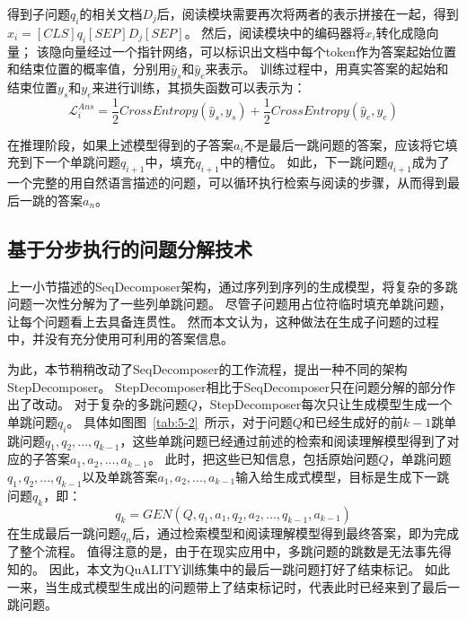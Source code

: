 得到子问题$q_i$的相关文档$D_j$后，阅读模块需要再次将两者的表示拼接在一起，得到$x_i=[CLS]q_i[SEP]D_j[SEP]$。
然后，阅读模块中的编码器将$x_i$转化成隐向量；
该隐向量经过一个指针网络，可以标识出文档中每个token作为答案起始位置和结束位置的概率值，分别用$\hat y_s$和$\hat y_e$来表示。
训练过程中，用真实答案的起始和结束位置$y_s$和$y_e$来进行训练，其损失函数可以表示为：
\begin{equation}
    \mathcal L^{Ans}_{i} = \frac{1}{2} CrossEntropy(\hat y_s,y_s) + \frac{1}{2} CrossEntropy(\hat y_e,y_e)
\end{equation}

在推理阶段，如果上述模型得到的子答案$a_i$不是最后一跳问题的答案，应该将它填充到下一个单跳问题$q_{i+1}$中，填充$q_{i+1}$中的槽位。
如此，下一跳问题$q_{i+1}$成为了一个完整的用自然语言描述的问题，可以循环执行检索与阅读的步骤，从而得到最后一跳的答案$a_n$。

\subsection{基于分步执行的问题分解技术}
上一小节描述的SeqDecomposer架构，通过序列到序列的生成模型，将复杂的多跳问题一次性分解为了一些列单跳问题。
尽管子问题用占位符临时填充单跳问题，让每个问题看上去具备连贯性。
然而本文认为，这种做法在生成子问题的过程中，并没有充分使用可利用的答案信息。

为此，本节稍稍改动了SeqDecomposer的工作流程，提出一种不同的架构StepDecomposer。
StepDecomposer相比于SeqDecomposer只在问题分解的部分作出了改动。
对于复杂的多跳问题$Q$，StepDecomposer每次只让生成模型生成一个单跳问题$q_i$。
具体如图图~\ref{tab:5-2}~所示，对于问题$Q$和已经生成好的前$k-1$跳单跳问题$q_1, q_2, ..., q_{k-1}$，这些单跳问题已经通过前述的检索和阅读理解模型得到了对应的子答案$a_1, a_2, ..., a_{k-1}$。
此时，把这些已知信息，包括原始问题$Q$，单跳问题$q_1, q_2, ..., q_{k-1}$以及单跳答案$a_1, a_2, ..., a_{k-1}$输入给生成式模型，目标是生成下一跳问题$q_k$，即：
\begin{equation}
    q_k = GEN(Q,q_1,a_1,q_2,a_2,...,q_{k-1},a_{k-1})
\end{equation}
在生成最后一跳问题$q_n$后，通过检索模型和阅读理解模型得到最终答案，即为完成了整个流程。
值得注意的是，由于在现实应用中，多跳问题的跳数是无法事先得知的。
因此，本文为QuALITY训练集中的最后一跳问题打好了结束标记。
如此一来，当生成式模型生成出的问题带上了结束标记时，代表此时已经来到了最后一跳问题。

